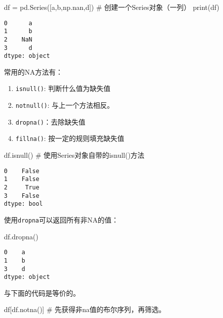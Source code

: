 \documentclass[
  letterpaper,
  DIV=11,
  numbers=noendperiod]{scrreprt}
\newenvironment{Shaded}{\begin{snugshade}}{\end{snugshade}}
\newcommand{\BuiltInTok}[1]{\textcolor[rgb]{0.00,0.23,0.31}{#1}}
\newcommand{\CommentTok}[1]{\textcolor[rgb]{0.37,0.37,0.37}{#1}}
\newcommand{\NormalTok}[1]{\textcolor[rgb]{0.00,0.23,0.31}{#1}}
\newcommand{\OperatorTok}[1]{\textcolor[rgb]{0.37,0.37,0.37}{#1}}
\newcommand{\StringTok}[1]{\textcolor[rgb]{0.13,0.47,0.30}{#1}}
\providecommand{\tightlist}{%
  \setlength{\itemsep}{0pt}\setlength{\parskip}{0pt}}\usepackage{longtable,booktabs,array}
\begin{document}
\begin{Shaded}
\begin{Highlighting}[]
\NormalTok{df }\OperatorTok{=}\NormalTok{ pd.Series([}\StringTok{\textquotesingle{}a\textquotesingle{}}\NormalTok{,}\StringTok{\textquotesingle{}b\textquotesingle{}}\NormalTok{,np.nan,}\StringTok{\textquotesingle{}d\textquotesingle{}}\NormalTok{]) }\CommentTok{\# 创建一个Series对象（一列）}
\BuiltInTok{print}\NormalTok{(df)}
\end{Highlighting}
\end{Shaded}

\begin{verbatim}
0      a
1      b
2    NaN
3      d
dtype: object
\end{verbatim}

常用的NA方法有：

\begin{enumerate}
\def\labelenumi{\arabic{enumi}.}
\tightlist
\item
  \texttt{isnull()}: 判断什么值为缺失值
\item
  \texttt{notnull()}: 与上一个方法相反。
\item
  \texttt{dropna()}：去除缺失值
\item
  \texttt{fillna()}: 按一定的规则填充缺失值
\end{enumerate}

\begin{Shaded}
\begin{Highlighting}[]
\NormalTok{df.isnull() }\CommentTok{\# 使用Series对象自带的isnull()方法}
\end{Highlighting}
\end{Shaded}

\begin{verbatim}
0    False
1    False
2     True
3    False
dtype: bool
\end{verbatim}

使用\texttt{dropna}可以返回所有非NA的值：

\begin{Shaded}
\begin{Highlighting}[]
\NormalTok{df.dropna()}
\end{Highlighting}
\end{Shaded}

\begin{verbatim}
0    a
1    b
3    d
dtype: object
\end{verbatim}

与下面的代码是等价的。

\begin{Shaded}
\begin{Highlighting}[]
\NormalTok{df[df.notna()] }\CommentTok{\# 先获得非na值的布尔序列，再筛选。}
\end{Highlighting}
\end{Shaded}
\end{document}
